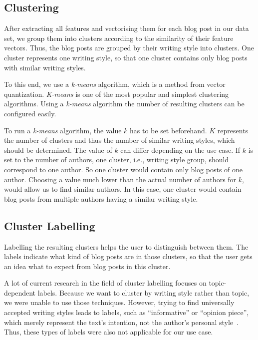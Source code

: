 
\subsection{Clustering}
\label{sec:clustering}

After extracting all features and vectorising them for each blog post in our data set, we group them into clusters according to the similarity of their feature vectors.
Thus, the blog posts are grouped by their writing style into clusters.
One cluster represents one writing style, so that one cluster contains only blog posts with similar writing styles.


To this end, we use a \textit{k-means} algorithm, which is a method from vector quantization.
\textit{K-means} is one of the most popular and simplest clustering algorithms.
Using a \textit{k-means} algorithm the number of resulting clusters can be configured easily.


To run a \textit{k-means} algorithm, the value $k$ has to be set beforehand.
$K$ represents the number of clusters and thus the number of similar writing styles, which should be determined.
The value of $k$ can differ depending on the use case.
If $k$ is set to the number of authors, one cluster, i.e., writing style group, should correspond to one author.
So one cluster would contain only blog posts of one author.
Choosing a value much lower than the actual number of authors for $k$, would allow us to find similar authors.
In this case, one cluster would contain blog posts from multiple authors having a similar writing style.



\subsection{Cluster Labelling}
\label{sec:cluster_labeling}

Labelling the resulting clusters helps the user to distinguish between them.
The labels indicate what kind of blog posts are in those clusters, so that the user gets an idea what to expect from blog posts in this cluster.


A lot of current research in the field of cluster labelling focuses on topic-dependent labels.
Because we want to cluster by writing style rather than topic, we were unable to use those techniques.
However, trying to find universally accepted writing styles leads to labels, such as ``informative'' or ``opinion piece'', which merely represent the text's intention, not the author's personal style~\cite{lee2001genres}.
Thus, these types of labels were also not applicable for our use case.


